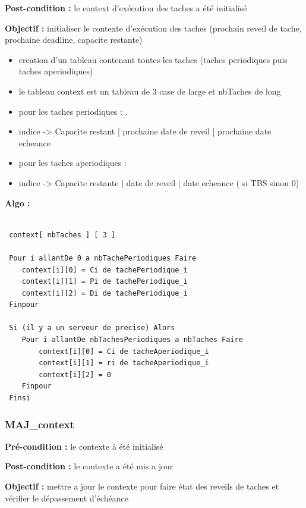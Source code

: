 				\textbf{Post-condition : }le context d'exécution des taches a été initialisé
				
				\textbf{Objectif : }initialiser le contexte d'exécution des taches (prochain reveil de tache, prochaine deadline, capacite restante)
				 \begin{itemize}
				 	\item creation d'un tableau contenant toutes les taches (taches periodiques puis taches aperiodiques)
 				 	\item le tableau context est un tableau de 3 case de large et nbTaches de long
 				 	\item pour les taches periodiques :
 		. 				\item[] indice -> Capacite restant | prochaine date de reveil | prochaine date echeance
 					\item pour les taches aperiodiques : 
 						\item[] indice -> Capacite restante | date de reveil | date echeance ( si TBS sinon 0)
				\end{itemize}
				\textbf{Algo :} 
					\begin{lstlisting}
 
 context[ nbTaches ] [ 3 ]
 
 Pour i allantDe 0 a nbTachePeriodiques Faire
 	context[i][0] = Ci de tachePeriodique_i
 	context[i][1] = Pi de tachePeriodique_i
 	context[i][2] = Di de tachePeriodique_i
 Finpour
 
 Si (il y a un serveur de precise) Alors
 	Pour i allantDe nbTachesPeriodiques a nbTaches Faire
 		context[i][0] = Ci de tacheAperiodique_i
 		context[i][1] = ri de tacheAperiodique_i
 		context[i][2] = 0 
 	Finpour
 Finsi
					\end{lstlisting}			
					
			\subsubsection{MAJ\_context}
				\textbf{Pré-condition : }le contexte à été initialisé
				
				\textbf{Post-condition : }le contexte a été mis a jour 
				
				\textbf{Objectif : }mettre a jour le contexte pour faire état des reveils de taches et vérifier le dépassement d'échéance 
				
